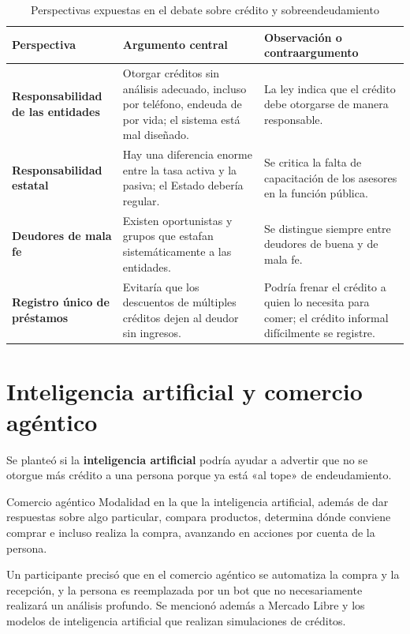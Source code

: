 \documentclass[12pt,oneside]{book}
\begin{document}
\begin{table}[H]
\centering
\caption{Perspectivas expuestas en el debate sobre crédito y sobreendeudamiento}
\begin{tabularx}{\textwidth}{>{\raggedright\arraybackslash}p{}>{\raggedright\arraybackslash}X>{\raggedright\arraybackslash}X}
\toprule
\textbf{Perspectiva} & \textbf{Argumento central} & \textbf{Observación o contraargumento} \\
\midrule
\textbf{Responsabilidad de las entidades} & Otorgar créditos sin análisis adecuado, incluso por teléfono, endeuda de por vida; el sistema está mal diseñado. & La ley indica que el crédito debe otorgarse de manera responsable. \\
\textbf{Responsabilidad estatal} & Hay una diferencia enorme entre la tasa activa y la pasiva; el Estado debería regular. & Se critica la falta de capacitación de los asesores en la función pública. \\
\textbf{Deudores de mala fe} & Existen oportunistas y grupos que estafan sistemáticamente a las entidades. & Se distingue siempre entre deudores de buena y de mala fe. \\
\textbf{Registro único de préstamos} & Evitaría que los descuentos de múltiples créditos dejen al deudor sin ingresos. & Podría frenar el crédito a quien lo necesita para comer; el crédito informal difícilmente se registre. \\
\bottomrule
\end{tabularx}
\end{table}

\section{Inteligencia artificial y comercio agéntico}

Se planteó si la \textbf{inteligencia artificial} podría ayudar a advertir que no se otorgue más crédito a una persona porque ya está «al tope» de endeudamiento.

\begin{definition}{Comercio agéntico}
Modalidad en la que la inteligencia artificial, además de dar respuestas sobre algo particular, compara productos, determina dónde conviene comprar e incluso realiza la compra, avanzando en acciones por cuenta de la persona.
\end{definition}

Un participante precisó que en el comercio agéntico se automatiza la compra y la recepción, y la persona es reemplazada por un bot que no necesariamente realizará un análisis profundo. Se mencionó además a Mercado Libre y los modelos de inteligencia artificial que realizan simulaciones de créditos.
\end{document}
